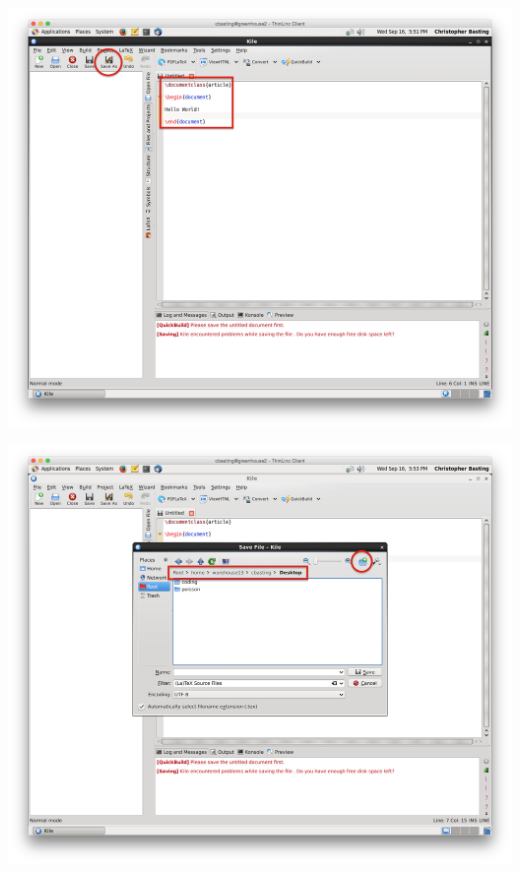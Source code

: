 \begin{frame}
	\includegraphics[width=\textwidth]{screenshots/kile-new-doc.png}
\end{frame}

\begin{frame}
	\includegraphics[width=\textwidth]{screenshots/kile-new-save-as.png}
\end{frame}

